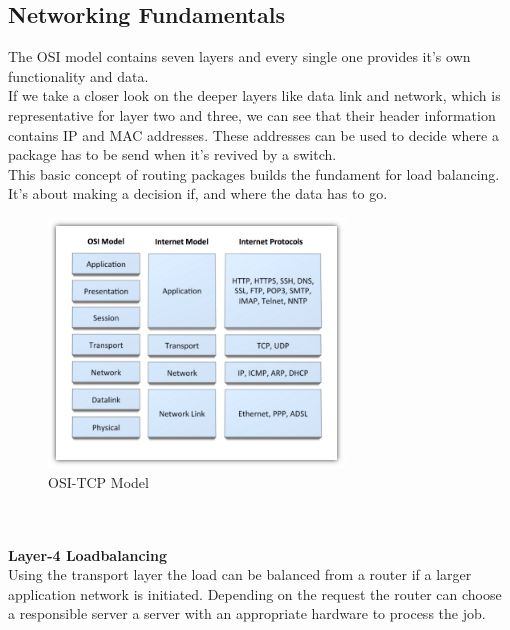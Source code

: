 \documentclass[12p]{article}
\begin{document}
	\subsection{Networking Fundamentals}
	The OSI model contains seven layers and every single one provides it's own functionality and data.\\
	If we take a closer look on the deeper layers like data link and network, which is representative for layer two and three, we can see that their header information contains IP and MAC addresses. These addresses can be used to decide where a package has to be send when it's revived by a switch.\\
	This basic concept of routing packages builds the fundament for load balancing. It's about making a decision if, and where the data has to go. \cite{lb_SFC}
	\\
	\begin{figure}[h!]
		\centering
		\includegraphics[width=0.7\textwidth]{img/OSI-TCP.png}
		\caption{OSI-TCP Model \cite{iso_model}}
	\end{figure}
	\\\\
	\textbf{Layer-4 Loadbalancing}\\
	Using the transport layer the load can be balanced from a router if a larger application network is initiated. Depending on the request the router can choose a responsible server a server with an appropriate hardware to process the job.
	
	\newpage
\end{document}
